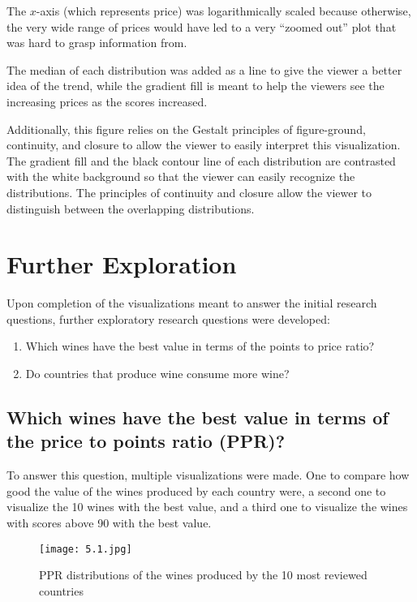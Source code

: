 The $x$-axis (which represents price) was logarithmically scaled because otherwise, the very wide range of prices would have led to a very ``zoomed out'' plot that was hard to grasp information from.

The median of each distribution was added as a line to give the viewer a better idea of the trend, while the gradient fill is meant to help the viewers see the increasing prices as the scores increased.

Additionally, this figure relies on the Gestalt principles of figure-ground, continuity, and closure to allow the viewer to easily interpret this visualization. The gradient fill and the black contour line of each distribution are contrasted with the white background so that the viewer can easily recognize the distributions. The principles of continuity and closure allow the viewer to distinguish between the overlapping distributions.


\section{Further Exploration}

Upon completion of the visualizations meant to answer the initial research questions, further exploratory research questions were developed:

\begin{enumerate}
  \item Which wines have the best value in terms of the points to price ratio? 
  \item Do countries that produce wine consume more wine?
\end{enumerate}

\subsection{Which wines have the best value in terms of the price to points ratio (PPR)?}

To answer this question, multiple visualizations were made. One to compare how good the value of the wines produced by each country were, a second one to visualize the 10 wines with the best value, and a third one to visualize the wines with scores above 90 with the best value.

\begin{figure}[h]
  \texttt{[image: 5.1.jpg]}
  \caption{PPR distributions of the wines produced by the 10 most reviewed countries} %
\end{figure}

